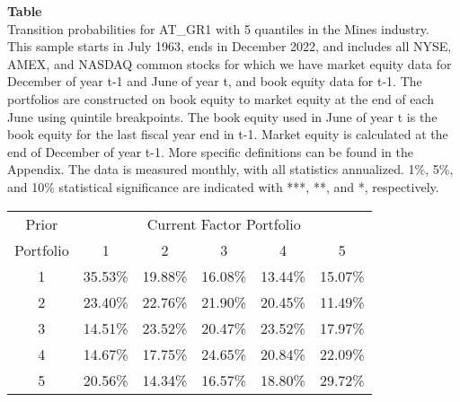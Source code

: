 \begin{table*}[ht!]
\raggedright
{}
\label{tab: transition_probs_AT_GR1_Mines_with_5_quantiles}
\textbf{Table \thetable} \\
Transition probabilities for AT_GR1 with 5 quantiles in the Mines industry. \\
\hspace*{1em}This sample starts in July 1963, ends in December 2022, and includes all NYSE, AMEX, and NASDAQ common stocks for which we have market equity data for December of year t-1 and June of year t, and book equity data for t-1. The portfolios are constructed on book equity to market equity at the end of each June using quintile breakpoints.  The book equity used in June of year t is the book equity for the last fiscal year end in t-1.  Market equity is calculated at the end of December of year t-1.  More specific definitions can be found in the Appendix.  The data is measured monthly, with all statistics annualized.  1\%, 5\%, and 10\% statistical significance are indicated with ***, **, and *, respectively. \\
\vspace{0.5em}
\centering
\begin{adjustbox}{max width=\textwidth}
\begin{tabular}{@{}cccccc@{}}
\toprule
Prior & \multicolumn{5}{c}{Current Factor Portfolio} \\
Portfolio & 1 & 2 & 3 & 4 & 5 \\
\midrule
1 & 35.53\% & 19.88\% & 16.08\% & 13.44\% & 15.07\% \\
2 & 23.40\% & 22.76\% & 21.90\% & 20.45\% & 11.49\% \\
3 & 14.51\% & 23.52\% & 20.47\% & 23.52\% & 17.97\% \\
4 & 14.67\% & 17.75\% & 24.65\% & 20.84\% & 22.09\% \\
5 & 20.56\% & 14.34\% & 16.57\% & 18.80\% & 29.72\% \\
\bottomrule
\end{tabular}
\end{adjustbox}
\end{table*}